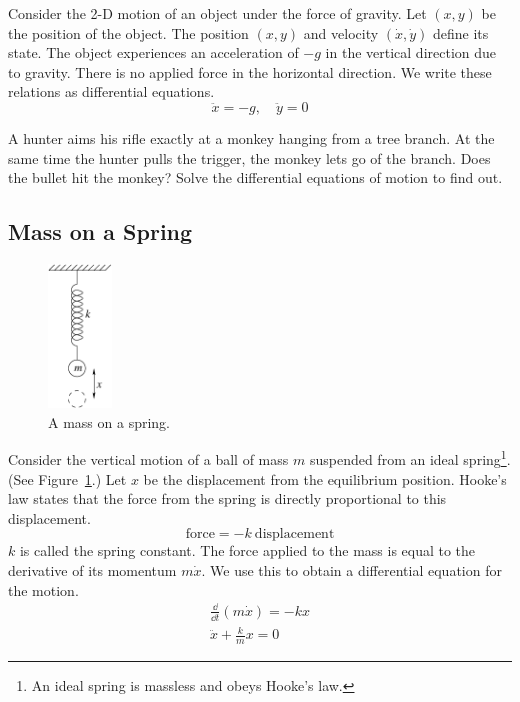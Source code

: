 Consider the 2-D motion of an object under the force of gravity.
Let $(x,y)$ be the position of the object.  The position $(x,y)$ and velocity
$(\dot{x}, \dot{y})$ define its state.  The 
object experiences an acceleration of $-g$ in the vertical direction 
due to gravity.  There is no applied force in the horizontal direction.
We write these relations as differential equations.
\[
\ddot{x} = - g, \quad \ddot{y} = 0
\]

\begin{Exercise}
  \label{exercise hunter monkey}
  A hunter aims his rifle exactly at a monkey hanging from a tree branch.
  At the same time the hunter pulls the trigger, the monkey lets go of
  the branch.  Does the bullet hit the monkey?  Solve the differential
  equations of motion to find out.
  
\end{Exercise}




\subsection{Mass on a Spring}


\begin{figure}[tb!]
  \begin{center}
    \includegraphics[width=0.15\textwidth]{ode/introduction/mass_on_spring}
  \end{center}
  \caption{A mass on a spring.}
  \label{figure mass on spring}
\end{figure}

Consider the vertical motion of a ball of mass $m$ suspended from an 
ideal spring\footnote{An ideal spring is massless and obeys Hooke's law.}.  
(See Figure~\ref{figure mass on spring}.)  Let $x$ be the displacement 
from the equilibrium position.  Hooke's law 
states that the force from the spring is directly proportional to this 
displacement.
\[
\mathrm{force} = - k \ \mathrm{displacement}
\]
$k$ is called the spring constant.  The force applied to the mass is equal
to the derivative of its momentum $m \dot{x}$.  We use this to obtain a 
differential equation for the motion.
\begin{gather*}
  \frac{\dd}{\dd t}(m \dot{x}) = - k x
  \\
  \ddot{x} + \frac{k}{m} x = 0
\end{gather*}

